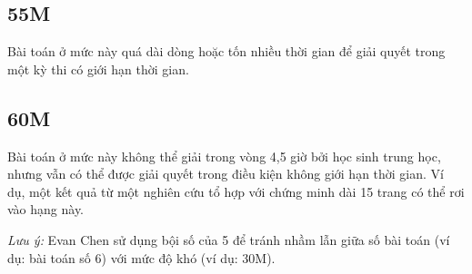 \documentclass[../imo-training-open-book.tex]{subfiles}
\begin{document}
\subsection*{55M}
\label{app:55M}
Bài toán ở mức này quá dài dòng hoặc tốn nhiều thời gian để giải quyết trong một kỳ thi có giới hạn thời gian.

\subsection*{60M}
\label{app:60M}
Bài toán ở mức này không thể giải trong vòng 4,5 giờ bởi học sinh trung học, nhưng vẫn có thể được giải quyết trong điều kiện không giới hạn thời gian.
Ví dụ, một kết quả từ một nghiên cứu tổ hợp với chứng minh dài 15 trang có thể rơi vào hạng này.

\textit{Lưu ý:} Evan Chen sử dụng bội số của 5 để tránh nhầm lẫn giữa số bài toán (ví dụ: bài toán số 6) với mức độ khó (ví dụ: 30M).
\end{document}
